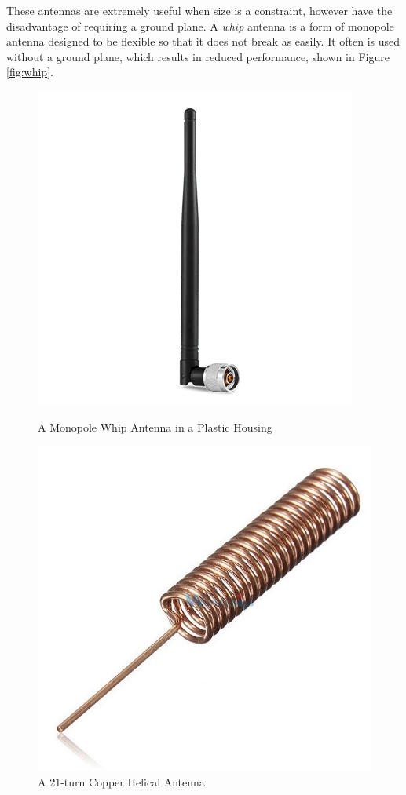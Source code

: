 These antennas are extremely useful when size is a constraint, however have the disadvantage of requiring a ground plane. A \textit{whip} antenna is a form of monopole antenna designed to be flexible so that it does not break as easily. It often is used without a ground plane, which results in reduced performance, shown in Figure \ref{fig:whip}. \cite{site-antennaTheory}

\begin{figure}[!htb]
  \begin{minipage}{.49\textwidth}
    \centering
    \includegraphics[width=0.6\linewidth]{whip}
    \caption{A Monopole Whip Antenna in a Plastic Housing \cite{site-whipAntenna}}
    \label{fig:whip}
  \end{minipage}
  \begin{minipage}{.49\textwidth}
    \centering
    \includegraphics[width=0.6\linewidth]{helical_uni}
    \caption{A 21-turn Copper Helical Antenna \cite{site-helicalAntenna}}
    \label{fig:helical_uni}
  \end{minipage}
\end{figure}

